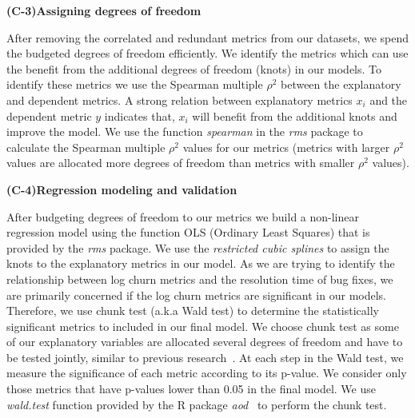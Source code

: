 \noindent \textbf{(C-3)Assigning degrees of freedom}


After removing the correlated and redundant metrics from our datasets, we spend the budgeted degrees of freedom efficiently. We identify the metrics which can use the benefit from the additional degrees of freedom (knots) in our models. To identify these metrics we use the Spearman multiple $\rho^{2}$ between the explanatory and dependent metrics. A strong relation between explanatory metrics $x_{i}$ and the dependent metric $y$ indicates that, $x_{i}$ will benefit from the additional knots and improve the model. We use the function \textsl{spearman} in the \textsl{rms} package to calculate the Spearman multiple $\rho^{2}$ values for our metrics (metrics with larger $\rho^{2}$ values are allocated more degrees of freedom than metrics with smaller $\rho^{2}$ values).

\noindent \textbf{(C-4)Regression modeling and validation}

After budgeting degrees of freedom to our metrics we build a non-linear regression model using the function OLS (Ordinary Least Squares) that is provided by the \textsl{rms} package. We use the \textsl{restricted cubic splines} to assign the knots to the explanatory metrics in our model. 
As we are trying to identify the relationship between log churn metrics and the resolution time of bug fixes, we are primarily concerned if the log churn metrics are significant in our models. Therefore, we use chunk test (a.k.a Wald test) to determine the statistically significant metrics to included in our final model. We choose chunk test as some of our explanatory variables are allocated several degrees of freedom and have to be tested jointly, similar to previous research~\cite{ShaneOLS}. At each step in the Wald test, we measure the significance of each metric according to its p-value. We consider only those metrics that have p-values lower than 0.05 in the final model. We use \textsl{wald.test} function provided by the R package \emph{aod}~\cite{waldtest} to perform the chunk test.  
%




